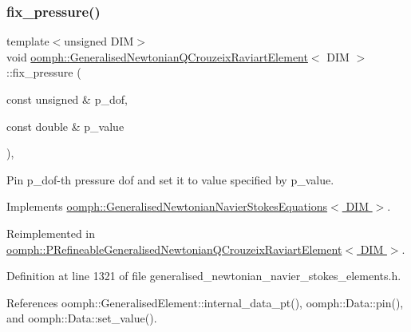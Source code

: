 \subsubsection{\texorpdfstring{fix\+\_\+pressure()}{fix\_pressure()}}
{\footnotesize\ttfamily template$<$unsigned D\+IM$>$ \\
void \hyperlink{classoomph_1_1GeneralisedNewtonianQCrouzeixRaviartElement}{oomph\+::\+Generalised\+Newtonian\+Q\+Crouzeix\+Raviart\+Element}$<$ D\+IM $>$\+::fix\+\_\+pressure (\begin{DoxyParamCaption}\item[{const unsigned \&}]{p\+\_\+dof,  }\item[{const double \&}]{p\+\_\+value }\end{DoxyParamCaption})\hspace{0.3cm}{\ttfamily [inline]}, {\ttfamily [virtual]}}



Pin p\+\_\+dof-\/th pressure dof and set it to value specified by p\+\_\+value. 



Implements \hyperlink{classoomph_1_1GeneralisedNewtonianNavierStokesEquations_a1a39938f37a0a61229e273ea541d5437}{oomph\+::\+Generalised\+Newtonian\+Navier\+Stokes\+Equations$<$ D\+I\+M $>$}.



Reimplemented in \hyperlink{classoomph_1_1PRefineableGeneralisedNewtonianQCrouzeixRaviartElement_aad3e0f421f695de35837393b7520d05a}{oomph\+::\+P\+Refineable\+Generalised\+Newtonian\+Q\+Crouzeix\+Raviart\+Element$<$ D\+I\+M $>$}.



Definition at line 1321 of file generalised\+\_\+newtonian\+\_\+navier\+\_\+stokes\+\_\+elements.\+h.



References oomph\+::\+Generalised\+Element\+::internal\+\_\+data\+\_\+pt(), oomph\+::\+Data\+::pin(), and oomph\+::\+Data\+::set\+\_\+value().

\mbox{\label{classoomph_1_1GeneralisedNewtonianQCrouzeixRaviartElement_a1a729e19ee5a5b4deb7c3f8a78786d63}} 
